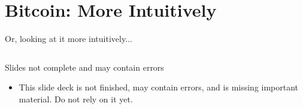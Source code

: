 \documentclass[aspectratio=169, lualatex, handout]{beamer}
\begin{document}
\section{Bitcoin: More Intuitively}

\begin{frame}{Or, looking at it more intuitively...}
	\begin{columns}[c]
		\begin{column}{0.5\textwidth}
		\end{column}
		\begin{column}{0.5\textwidth}
		\end{column}
	\end{columns}
\end{frame}

\begin{frame}{Slides not complete and may contain errors}
	\begin{itemize}
		\item This slide deck is not finished, may contain errors, and is missing important material. Do not rely on it yet.
	\end{itemize}
\end{frame}

\begin{frame}[plain]
	\titlepage
\end{frame}
\end{document}
